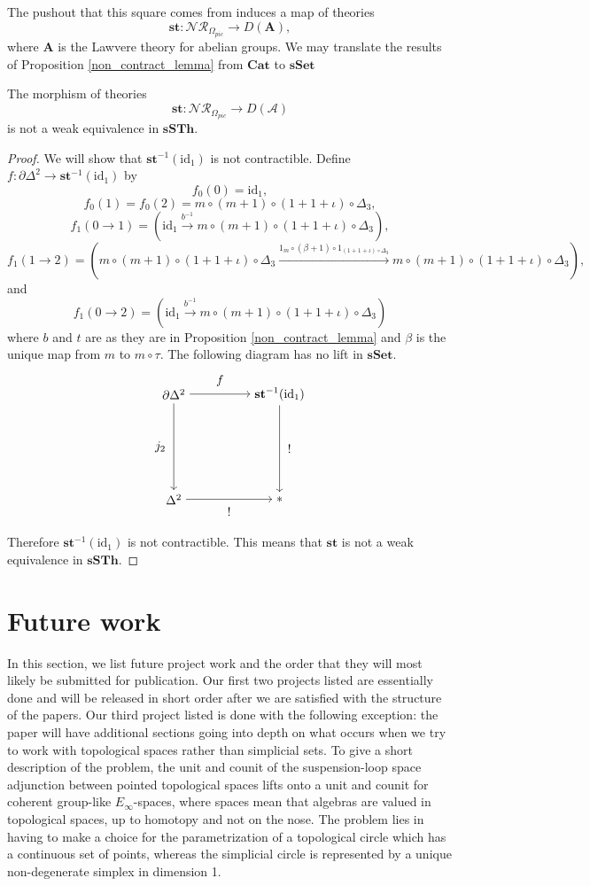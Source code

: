 \documentclass{tac}
\begin{document}
The pushout that this square comes from induces a map of theories
\[
\mathbf{st}:\mathcal{NR}_{\Omega_{pic}}\to D(\mathbf{A}),
\]
where $\mathbf{A}$ is the Lawvere theory for abelian groups. We may translate the results of Proposition \ref{non_contract_lemma} from $\mathbf{Cat}$ to $\mathbf{sSet}$

\begin{theorem}\label{not_we_eq}
The morphism of theories 
\[
\mathbf{st}:\mathcal{NR}_{\Omega_{pic}}\to D(\mathcal{A})
\]
is not a weak equivalence in $\mathbf{sSTh}$.
\end{theorem}

\begin{proof}
We will show that $\mathbf{st}^{-1}(\text{id}_1)$ is not contractible. Define $f:\partial\Delta^2\to \mathbf{st}^{-1}(\text{id}_1)$ by
\[
f_0(0)=\text{id}_1,
\]
\[
f_0(1)=f_0(2)=m\circ (m+1)\circ(1+1+\iota)\circ\Delta_3,
\]
\[
f_1(0\to 1)=(\text{id}_1\xrightarrow{b^{-1}}m\circ (m+1)\circ(1+1+\iota)\circ\Delta_3),
\]
\[
f_1(1\to 2)=(m\circ (m+1)\circ(1+1+\iota)\circ\Delta_3\xrightarrow{1_m\circ (\beta+1)\circ 1_{(1+1+\iota)\circ \Delta_3}}m\circ (m+1)\circ(1+1+\iota)\circ\Delta_3),
\]
and
\[
f_1(0\to 2)=(\text{id}_1\xrightarrow{b^{-1}}m\circ (m+1)\circ(1+1+\iota)\circ\Delta_3)
\]
where $b$ and $t$ are as they are in Proposition \ref{non_contract_lemma} and $\beta$ is the unique map from $m$ to $m\circ \tau$. The following diagram has no lift in $\mathbf{sSet}$.
\[
\begin{tikzpicture}[node distance=3cm]
\node (A) {$\partial\Delta^2$};
\node (B)[right of=A] {$\mathbf{st}^{-1}(\text{id}_1)$};
\node (C)[below of=A]{$\Delta^2$};
\node (D)[right of=C]{$*$};
\draw[->] (A) to node[above=3] {$f$} (B);
\draw[->] (A) to node[left=3] {$j_2$} (C);
\draw[->] (B) to node[right=3] {$!$} (D);
\draw[->] (C) to node[below=3] {$!$} (D);
\end{tikzpicture}
\]
Therefore $\mathbf{st}^{-1}(\text{id}_1)$ is not contractible. This means that $\mathbf{st}$ is not a weak equivalence in $\mathbf{sSTh}$.
\end{proof}

\section{Future work} 
In this section, we list future project work and the order that they will most likely be submitted for publication. Our first two projects listed are essentially done and will be released in short order after we are satisfied with the structure of the papers. Our third project listed  is done with the following exception: the paper will have additional sections going into depth on what occurs when we try to work with topological spaces rather than simplicial sets. To give a short description of the problem, the unit and counit of the suspension-loop space adjunction between pointed topological spaces lifts onto a unit and counit for coherent group-like $E_\infty$-spaces, where spaces mean that algebras are valued in topological spaces, up to homotopy and not on the nose. The problem lies in having to make a choice for the parametrization of a topological circle which has a continuous set of points, whereas the simplicial circle is represented by a unique non-degenerate simplex in dimension 1.
\end{document}
